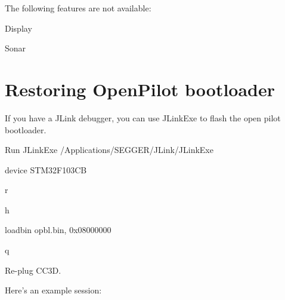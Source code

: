 The following features are not available\+:
\begin{DoxyItemize}
\item Display
\item Sonar
\end{DoxyItemize}

\section*{Restoring Open\+Pilot bootloader}

If you have a J\+Link debugger, you can use J\+Link\+Exe to flash the open pilot bootloader.


\begin{DoxyEnumerate}
\item Run J\+Link\+Exe {\ttfamily /\+Applications/\+S\+E\+G\+G\+E\+R/\+J\+Link/\+J\+Link\+Exe}
\item {\ttfamily device S\+T\+M32\+F103\+C\+B}
\item {\ttfamily r}
\item {\ttfamily h}
\item {\ttfamily loadbin opbl.\+bin, 0x08000000}
\item {\ttfamily q}
\item Re-\/plug C\+C3\+D.
\end{DoxyEnumerate}

Here's an example session\+:

